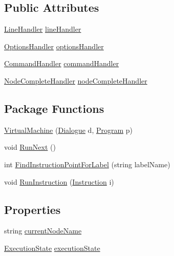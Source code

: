 \subsection*{Public Attributes}
\begin{DoxyCompactItemize}
\item 
\hyperlink{a00086_aac9ec1011ea2c01460044d7c8355f398}{Line\-Handler} \hyperlink{a00086_a29b30454f068fc7e107d48bff4346fd9}{line\-Handler}
\item 
\hyperlink{a00086_a78dfd54b743e53078eed19ab7be2b6cf}{Options\-Handler} \hyperlink{a00086_acd25fe2e3aa90dc87ba25d9af904465b}{options\-Handler}
\item 
\hyperlink{a00086_a1b57359378059b134ba76acddafd8d81}{Command\-Handler} \hyperlink{a00086_ab89b02227b92c74552f719afd47848e4}{command\-Handler}
\item 
\hyperlink{a00086_a5bf3aa51578847c18191fec665a840f9}{Node\-Complete\-Handler} \hyperlink{a00086_a5129c63e67e2d4e2780d86b8351320a2}{node\-Complete\-Handler}
\end{DoxyCompactItemize}
\subsection*{Package Functions}
\begin{DoxyCompactItemize}
\item 
\hyperlink{a00086_aefa64c4353e5c261f1189649638e49a6}{Virtual\-Machine} (\hyperlink{a00050}{Dialogue} d, \hyperlink{a00081}{Program} p)
\item 
void \hyperlink{a00086_af3cc0337914b9f66454a3d52208dba5f}{Run\-Next} ()
\item 
int \hyperlink{a00086_af613c8b2d098678b6ea05b509c0a0cb6}{Find\-Instruction\-Point\-For\-Label} (string label\-Name)
\item 
void \hyperlink{a00086_ad2caf9ca4f00cdcbd58983be7c106971}{Run\-Instruction} (\hyperlink{a00058}{Instruction} i)
\end{DoxyCompactItemize}
\subsection*{Properties}
\begin{DoxyCompactItemize}
\item 
string \hyperlink{a00086_ab3afe8360a344c16c21213edb3641481}{current\-Node\-Name}
\item 
\hyperlink{a00086_add28fa9c8a45ca579e84d05920bbc42d}{Execution\-State} \hyperlink{a00086_a66491da06023dabfb63d09e6ccbba74f}{execution\-State}
\end{DoxyCompactItemize}
